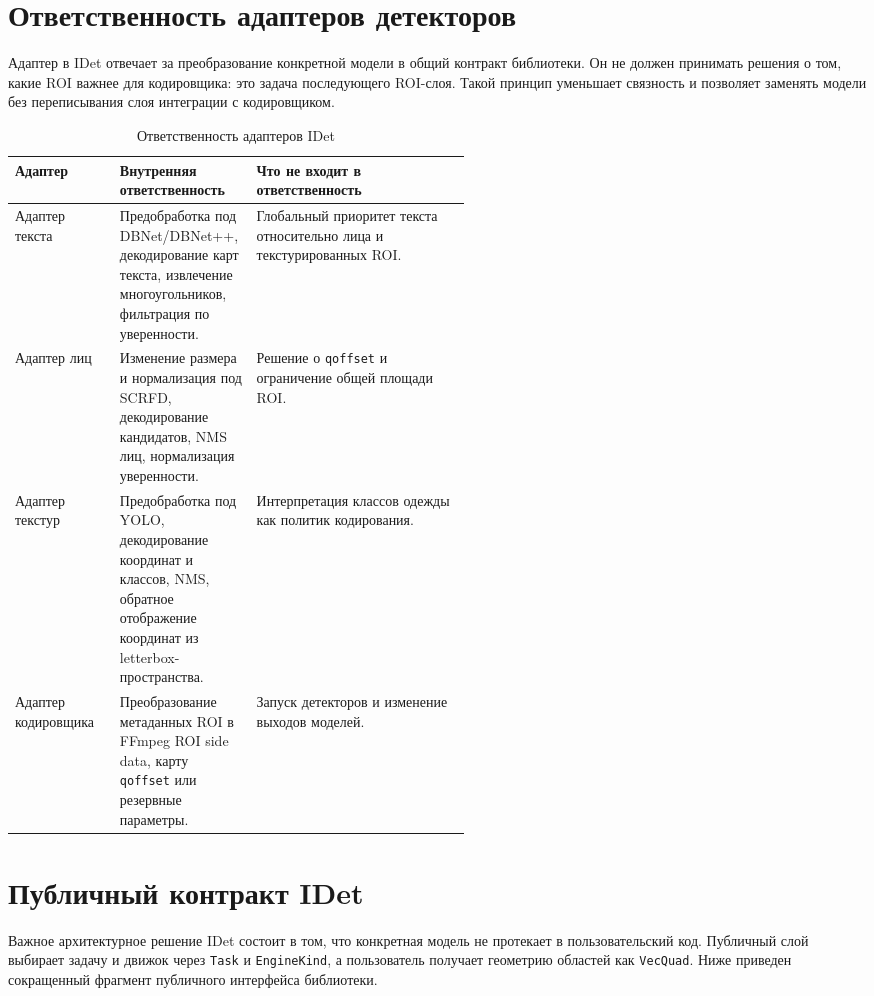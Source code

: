 \documentclass[12pt,a4paper,oneside,openany]{report}
\begin{document}
\section{Ответственность адаптеров детекторов}

Адаптер в IDet отвечает за преобразование конкретной модели в общий контракт библиотеки. Он не
должен принимать решения о том, какие ROI важнее для кодировщика: это задача последующего
ROI-слоя. Такой принцип уменьшает связность и позволяет заменять модели без переписывания слоя
интеграции с кодировщиком.

\begin{table}[!htbp]
  \centering
  \caption{Ответственность адаптеров IDet}
  \label{tab:adapter_responsibilities}
  \small
  \begin{tabularx}{\linewidth}{@{}P{0.23\linewidth}P{0.30\linewidth}Y@{}}
    \toprule
    Адаптер & Внутренняя ответственность & Что не входит в ответственность \\
    \midrule
    Адаптер текста &
    Предобработка под DBNet/DBNet++, декодирование карт текста, извлечение многоугольников,
      фильтрация по уверенности. &
    Глобальный приоритет текста относительно лица и текстурированных ROI. \\
    Адаптер лиц &
    Изменение размера и нормализация под SCRFD, декодирование кандидатов, NMS лиц, нормализация
      уверенности. &
    Решение о \texttt{qoffset} и ограничение общей площади ROI. \\
    Адаптер текстур &
    Предобработка под YOLO, декодирование координат и классов, NMS, обратное отображение
      координат из letterbox-пространства. &
    Интерпретация классов одежды как политик кодирования. \\
    Адаптер кодировщика &
    Преобразование метаданных ROI в FFmpeg ROI side data, карту \texttt{qoffset} или резервные
      параметры. &
    Запуск детекторов и изменение выходов моделей. \\
    \bottomrule
  \end{tabularx}
\end{table}


\section{Публичный контракт IDet}

Важное архитектурное решение IDet состоит в том, что конкретная модель не протекает в
пользовательский код. Публичный слой выбирает задачу и движок через \texttt{Task} и
\texttt{EngineKind}, а пользователь получает геометрию областей как \texttt{VecQuad}. Ниже
приведен сокращенный фрагмент публичного интерфейса библиотеки.
\end{document}
